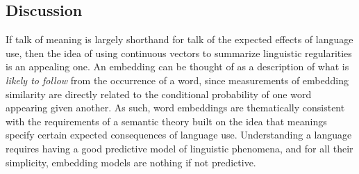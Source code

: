 \subsection{Discussion}

If talk of meaning is largely shorthand for talk of the expected effects of language use, then the idea of using continuous vectors to summarize linguistic regularities is an appealing one. An embedding can be thought of as a description of what is \textit{likely to follow} from the occurrence of a word, since measurements of embedding similarity are directly related to the conditional probability of one word appearing given another. As such, word embeddings are thematically consistent with the requirements of a semantic theory built on the idea that meanings specify certain expected consequences of language use. Understanding a language requires having a good predictive model of linguistic phenomena, and for all their simplicity, embedding models are nothing if not predictive.

